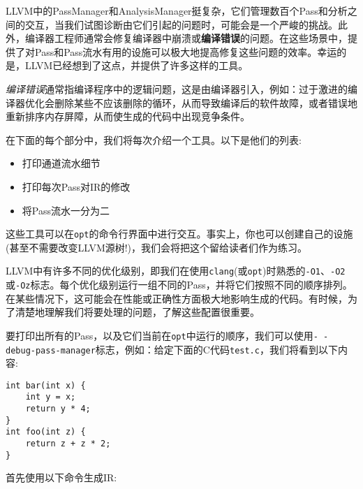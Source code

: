 
LLVM中的PassManager和AnalysisManager挺复杂，它们管理数百个Pass和分析之间的交互，当我们试图诊断由它们引起的问题时，可能会是一个严峻的挑战。此外，编译器工程师通常会修复编译器中崩溃或\textbf{编译错误}的问题。在这些场景中，提供了对Pass和Pass流水有用的设施可以极大地提高修复这些问题的效率。幸运的是，LLVM已经想到了这点，并提供了许多这样的工具。

\begin{tcolorbox}[colback=blue!5!white,colframe=blue!75!black, fonttitle=\bfseries,title=编译错误]	
\hspace*{0.7cm}\textit{编译错误}通常指编译程序中的逻辑问题，这是由编译器引入，例如：过于激进的编译器优化会删除某些不应该删除的循环，从而导致编译后的软件故障，或者错误地重新排序内存屏障，从而使生成的代码中出现竞争条件。
\end{tcolorbox}

在下面的每个部分中，我们将每次介绍一个工具。以下是他们的列表:

\begin{itemize}
\item 打印通道流水细节
\item 打印每次Pass对IR的修改
\item 将Pass流水一分为二
\end{itemize}

这些工具可以在\texttt{opt}的命令行界面中进行交互。事实上，你也可以创建自己的设施(甚至不需要改变LLVM源树!)，我们会将把这个留给读者们作为练习。


LLVM中有许多不同的优化级别，即我们在使用\texttt{clang}(或\texttt{opt})时熟悉的\texttt{-O1}、\texttt{-O2}或\texttt{-Oz}标志。每个优化级别运行一组不同的Pass，并将它们按照不同的顺序排列。在某些情况下，这可能会在性能或正确性方面极大地影响生成的代码。有时候，为了清楚地理解我们将要处理的问题，了解这些配置很重要。

要打印出所有的Pass，以及它们当前在\texttt{opt}中运行的顺序，我们可以使用\texttt{-\,-debug-pass-manager}标志，例如：给定下面的C代码\texttt{test.c}，我们将看到以下内容:

\begin{lstlisting}[style=styleCXX]
int bar(int x) {
	int y = x;
	return y * 4;
}
int foo(int z) {
	return z + z * 2;
}
\end{lstlisting}

首先使用以下命令生成IR:


